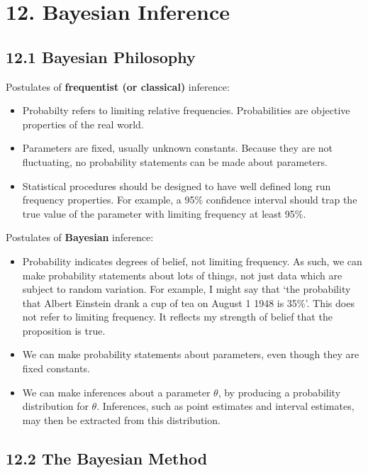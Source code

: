 \section*{12. Bayesian Inference}\label{bayesian-inference}

\subsection*{12.1 Bayesian Philosophy}\label{bayesian-philosophy}

Postulates of \textbf{frequentist (or classical)} inference:

\begin{itemize}[tightlist]
\item
  Probabilty refers to limiting relative frequencies. Probabilities are
  objective properties of the real world.
\item
  Parameters are fixed, usually unknown constants. Because they are not
  fluctuating, no probability statements can be made about parameters.
\item
  Statistical procedures should be designed to have well defined long
  run frequency properties. For example, a 95\% confidence interval
  should trap the true value of the parameter with limiting frequency at
  least 95\%.
\end{itemize}

Postulates of \textbf{Bayesian} inference:

\begin{itemize}[tightlist]
\item
  Probability indicates degrees of belief, not limiting frequency. As
  such, we can make probability statements about lots of things, not
  just data which are subject to random variation. For example, I might
  say that `the probability that Albert Einstein drank a cup of tea on
  August 1 1948 is 35\%'. This does not refer to limiting frequency. It
  reflects my strength of belief that the proposition is true.
\item
  We can make probability statements about parameters, even though they
  are fixed constants.
\item
  We can make inferences about a parameter \(\theta\), by producing a
  probability distribution for \(\theta\). Inferences, such as point
  estimates and interval estimates, may then be extracted from this
  distribution.
\end{itemize}

\subsection*{12.2 The Bayesian Method}\label{the-bayesian-method}

